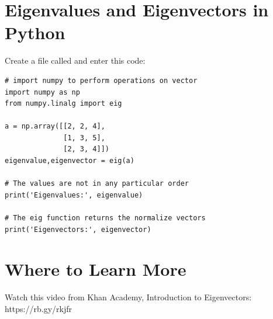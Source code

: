 \section{Eigenvalues and Eigenvectors in Python}
Create a file called  and enter this code:

\begin{Verbatim}
# import numpy to perform operations on vector
import numpy as np
from numpy.linalg import eig

a = np.array([[2, 2, 4], 
              [1, 3, 5],
              [2, 3, 4]])
eigenvalue,eigenvector = eig(a)

# The values are not in any particular order
print('Eigenvalues:', eigenvalue)

# The eig function returns the normalize vectors
print('Eigenvectors:', eigenvector)

\end{Verbatim}

\section{Where to Learn More}
Watch this video from Khan Academy,  Introduction to Eigenvectors: https://rb.gy/rkjfr